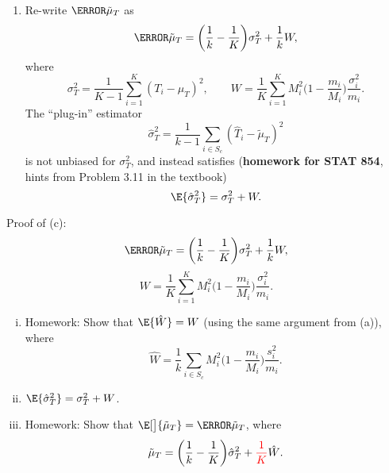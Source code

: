 \begin{enumerate}[(2)]
      \item Re-write $ \V{\tilde{\mu}_T} $ as
            \[ \V{\tilde{\mu}_T}=\biggl(\frac{1}{k}-\frac{1}{K}\biggr)\sigma_T^2+\frac{1}{k}W, \]
            where
            \[ \sigma_T^2=\frac{1}{K-1}\sum_{i=1}^{K}(T_i-\mu_T)^2,\qquad W=\frac{1}{K}\sum_{i=1}^{K}M_i^2\biggl(1-\frac{m_i}{M_i}\biggr)\frac{\sigma_i^2}{m_i}. \]
            The ``plug-in'' estimator
            \[ \hat{\sigma}_T^2=\frac{1}{k-1}\sum_{i\in S_c}(\hat{T}_i-\tilde{\mu}_T)^2 \]
            is not unbiased for $ \sigma_T^2 $, and instead satisfies (\textbf{homework for STAT 854},
            hints from Problem 3.11 in the textbook)
            \[ \E{\hat{\sigma}_T^2}=\sigma_T^2+W. \]
\end{enumerate}
Proof of (c):
\[ \V{\tilde{\mu}_T}=\biggl(\frac{1}{k}-\frac{1}{K}\biggr)\sigma_T^2+\frac{1}{k}W, \]
\[ W=\frac{1}{K}\sum_{i=1}^{K}M_i^2\biggl(1-\frac{m_i}{M_i}\biggr)\frac{\sigma_i^2}{m_i}. \]
\begin{enumerate}[(i)]
      \item Homework: Show that $ \E{\hat{W}}=W $ (using the same argument from (a)), where
            \[ \hat{W}=\frac{1}{k}\sum_{i\in S_c}M_i^2\biggl(1-\frac{m_i}{M_i}\biggr)\frac{s_i^2}{m_i}. \]
      \item $ \E{\hat{\sigma}_T^2}=\sigma_T^2+W $.
      \item Homework: Show that $ \E[\big]{\v{\tilde{\mu}_T}}=\V{\tilde{\mu}_T} $, where
            \[ \relax{\tilde{\mu}_T}=\biggl(\frac{1}{k}-\frac{1}{K}\biggr)\hat{\sigma}_T^2+{\textcolor{red}{\frac{1}{K}}}\hat{W}. \]
\end{enumerate}
